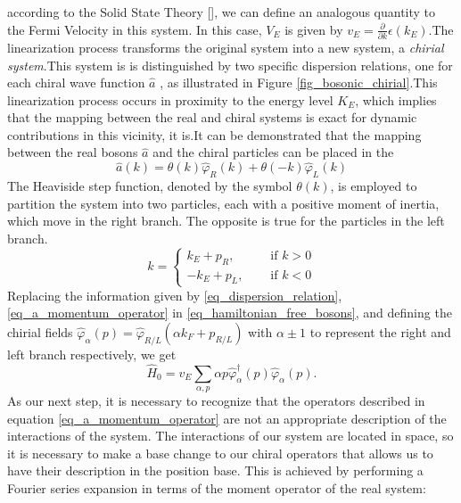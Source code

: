 according to the Solid State Theory [], we can define an analogous quantity to the Fermi Velocity in this system. In this case, $V_E$ is given by $v_E = \frac{\partial}{\partial k} \epsilon(k_E)$.The linearization process transforms the original system into a new system, a \textit{chirial system}.This system is is distinguished by two specific dispersion relations, one for each chiral wave function $\hat{a}$ , as illustrated in Figure \ref{fig_bosonic_chirial}.This linearization process occurs  in proximity to the energy level $K_E$, which implies that the mapping between the real and chiral systems is exact for dynamic contributions in this vicinity, it is.It can be demonstrated that the mapping between the real bosons $\hat{a}$ and the chiral particles can be placed in the 
\begin{equation} \label{eq_a_momentum_operator}
    \hat{a}(k)=\theta(k) \hat{\varphi}_{R}(k)+\theta(-k) \hat{\varphi}_{L}(k)
\end{equation}
The Heaviside step function, denoted by the symbol $\theta(k)$, is employed to partition the system into two particles, each with a positive moment of inertia, which move in the right branch. The opposite is true for the particles in the left branch. 
\begin{equation} \label{eq_momentum_each_branch}
    k=\left\{
        \begin{aligned}
            k_{E}+p_{R}, &\quad \text { if } k>0 \\
            -k_{E}+p_{L}, &\quad \text { if } k<0
        \end{aligned}
        \right.
\end{equation}
Replacing the information given by \eqref{eq_dispersion_relation}, \eqref{eq_a_momentum_operator} in \eqref{eq_hamiltonian_free_bosons}, and defining the chirial fields $\hat{\varphi}_{\alpha}(p)=\hat{\varphi}_{R / L}\left(\alpha k_{F}+p_{R / L}\right)$ with $\alpha \pm 1$ to represent the right and left branch respectively, we get
\begin{equation}
    \hat{H}_{0}=v_{E} \sum_{\alpha, p} \alpha p \hat{\varphi}_{\alpha}^{\dagger}(p) \hat{\varphi}_{\alpha}(p).
\end{equation}
As our next step, it is necessary to recognize that the operators described in equation \eqref{eq_a_momentum_operator} are not an appropriate description of the interactions of the system. The interactions of our system are located in space, so it is necessary to make a base change to our chiral operators that allows us to have their description in the position base. This is achieved by performing a Fourier series expansion in terms of the moment operator of the real system:
